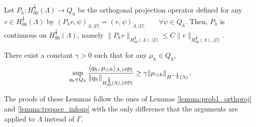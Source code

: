 \documentclass[r]{siamart171218}
\begin{document}
\begin{lemma}\label{lemma:prob2_orthproj}
Let $P_h: H^{\frac 12}_{00}(\Lambda) \longrightarrow Q_h$ be the orthogonal projection operator defined  for any $v \in H^{\frac 12}_{00}(\Lambda)$ by $(P_h v , \psi)_{\Lambda,|\DD|}= (v, \psi)_{\Lambda , |\DD|} \qquad \forall \psi \in Q_h$.  
Then, $P_h$ is continuous on $H^{\frac 12}_{00}(\Lambda)$, namely
$\|P_h v\|_{H^{\frac 12}_{00}(\Lambda),|\DD|} \leq C \|v\|_{H^{\frac 12}_{00}(\Lambda),|\DD|}$.
\end{lemma}

\begin{lemma}\label{infsup_avr_trspace}
There exist a constant $\gamma >0$ such that for any $\mu_h \in Q_h$,
\begin{equation*}
\sup_{\substack{q_h \in Q_h}} \frac{\langle q_h , \mu_{\odot h} \rangle_{\Lambda, |\partial\mathcal{D}|}}{ \|q_h\|_{H^{\frac 12}_{00}(\Lambda),|\partial\mathcal{D}|}} \geq \gamma \|\mu_{\odot h}\|_{H^{-\frac 12}(\Lambda)}\,.
\end{equation*} 
\end{lemma}

The proofs of these Lemmas follow the ones of Lemmas \ref{lemma:prob1_orthproj} and \ref{lemma:trspace_infsup} with the only difference that the arguments are applied to $\Lambda$ instead of $\Gamma$.
\end{document}
